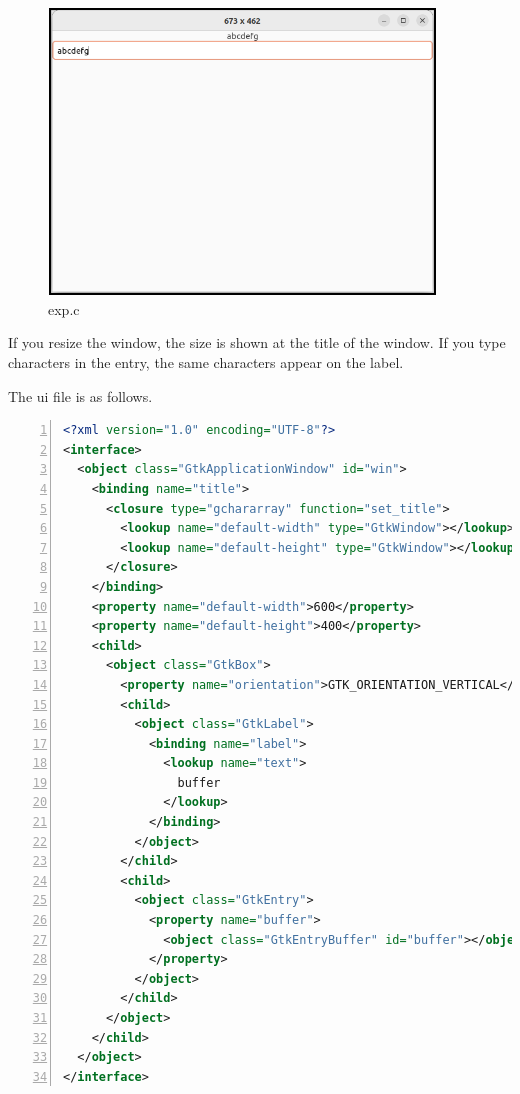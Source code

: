 \begin{figure}
\centering
\includegraphics[width=10.3cm,height=7.6cm]{../image/exp.png}
\caption{exp.c}
\end{figure}

If you resize the window, the size is shown at the title of the window.
If you type characters in the entry, the same characters appear on the
label.

The ui file is as follows.

\begin{lstlisting}[language=XML, numbers=left]
<?xml version="1.0" encoding="UTF-8"?>
<interface>
  <object class="GtkApplicationWindow" id="win">
    <binding name="title">
      <closure type="gchararray" function="set_title">
        <lookup name="default-width" type="GtkWindow"></lookup>
        <lookup name="default-height" type="GtkWindow"></lookup>
      </closure>
    </binding>
    <property name="default-width">600</property>
    <property name="default-height">400</property>
    <child>
      <object class="GtkBox">
        <property name="orientation">GTK_ORIENTATION_VERTICAL</property>
        <child>
          <object class="GtkLabel">
            <binding name="label">
              <lookup name="text">
                buffer
              </lookup>
            </binding>
          </object>
        </child>
        <child>
          <object class="GtkEntry">
            <property name="buffer">
              <object class="GtkEntryBuffer" id="buffer"></object>
            </property>
          </object>
        </child>
      </object>
    </child>
  </object>
</interface>
\end{lstlisting}

